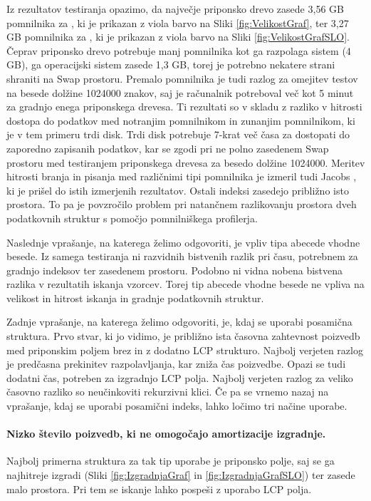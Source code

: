 Iz rezultatov testiranja opazimo, da največje priponsko drevo zasede 3,56 GB pomnilnika za \DNK, ki je prikazan z viola barvo na Sliki \ref{fig:VelikostGraf}, ter 3,27 GB pomnilnika za \NK, ki je prikazan z viola barvo na Sliki \ref{fig:VelikostGrafSLO}. Čeprav priponsko drevo potrebuje manj pomnilnika kot ga razpolaga sistem (4 GB), ga operacijski sistem zasede 1,3 GB, torej je potrebno nekatere strani shraniti na Swap prostoru. Premalo pomnilnika je tudi razlog za omejitev testov na besede dolžine 1024000 znakov, saj je računalnik potreboval več kot 5 minut za gradnjo enega priponskega drevesa. Ti rezultati so v skladu z razliko v hitrosti dostopa do podatkov med notranjim pomnilnikom in zunanjim pomnilnikom, ki je v tem primeru trdi disk. Trdi disk potrebuje 7-krat več časa za dostopati do zaporedno zapisanih podatkov, kar se zgodi pri ne polno zasedenem Swap prostoru med testiranjem priponskega drevesa za besedo dolžine 1024000. Meritev hitrosti branja in pisanja med različnimi tipi pomnilnika je izmeril tudi Jacobs \cite{Jacobs2009}, ki je prišel do istih izmerjenih rezultatov. Ostali indeksi zasedejo približno isto prostora. To pa je povzročilo problem pri natančnem razlikovanju prostora dveh podatkovnih struktur s pomočjo pomnilniškega profilerja.

Naslednje vprašanje, na katerega želimo odgovoriti, je vpliv tipa abecede vhodne besede. Iz samega testiranja ni razvidnih bistvenih razlik pri času, potrebnem za gradnjo indeksov ter zasedenem prostoru. Podobno ni vidna nobena bistvena razlika v rezultatih iskanja vzorcev. Torej tip abecede vhodne besede ne vpliva na velikost in hitrost iskanja in gradnje podatkovnih struktur.

Zadnje vprašanje, na katerega želimo odgovoriti, je, kdaj se uporabi posamična struktura. Prvo stvar, ki jo vidimo, je približno ista časovna zahtevnost poizvedb med priponskim poljem brez in z dodatno LCP strukturo. Najbolj verjeten razlog je predčasna prekinitev razpolavljanja, kar zniža čas poizvedbe. Opazi se tudi dodatni čas, potreben za izgradnjo LCP polja. Najbolj verjeten razlog za veliko časovno razliko so neučinkoviti rekurzivni klici. Če pa se vrnemo nazaj na vprašanje, kdaj se uporabi posamični indeks, lahko ločimo tri načine uporabe. 
\paragraph{Nizko število poizvedb, ki ne omogočajo amortizacije izgradnje.} 
Najbolj primerna struktura za tak tip uporabe je priponsko polje, saj se ga najhitreje izgradi (Sliki \ref{fig:IzgradnjaGraf} in \ref{fig:IzgradnjaGrafSLO}) ter zasede malo prostora. Pri tem se iskanje lahko pospeši z uporabo LCP polja. 

